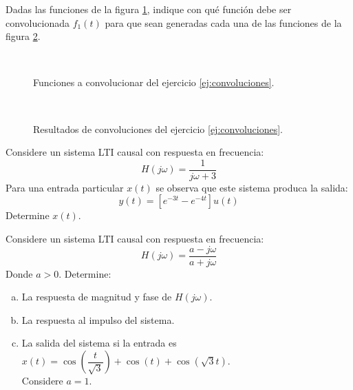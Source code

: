 \begin{ejercicio}
    Dadas las funciones de la figura \ref{fig:5funciones}, indique con qué función debe ser convolucionada $f_1(t)$ para que sean generadas cada una de las funciones de la figura \ref{fig:convoluciones}.
    \label{ej:convoluciones}
    \begin{figure}[!h]
        \centering
        \subfloat{
            
        }
        \subfloat{
            
        }\\
        \subfloat{
            
        }
        \subfloat{
            
        }
        \subfloat{
            
        }
        \caption{Funciones a convolucionar del ejercicio \ref{ej:convoluciones}.}
        \label{fig:5funciones}
    \end{figure}
    \begin{figure}[!h]
        \centering
        \subfloat{
            
        }
        \subfloat{
            
        }\\
        \subfloat{
            
        }
        \subfloat{
            
        }
        \caption{Resultados de convoluciones del ejercicio \ref{ej:convoluciones}.}
        \label{fig:convoluciones}
    \end{figure}
\end{ejercicio}

\begin{ejercicio}
    Considere un sistema LTI causal con respuesta en frecuencia:
    $$ H(j\omega) = \dfrac{1}{j\omega+3} $$
    Para una entrada particular $x(t)$ se observa que este sistema produca la salida:
    $$ y(t) = [e^{-3t}-e^{-4t}]u(t) $$
    Determine $x(t)$.
\end{ejercicio}

\begin{ejercicio}
    Considere un sistema LTI causal con respuesta en frecuencia:
    $$ H(j\omega) = \dfrac{a-j\omega}{a+j\omega}$$
    Donde $a>0$. Determine:
    \begin{enumerate}[a.]
        \item La respuesta de magnitud y fase de $H(j\omega)$.
        \item La respuesta al impulso del sistema.
        \item La salida del sistema si la entrada es $x(t)=\cos\left(\dfrac{t}{\sqrt{3}}\right)+\cos(t)+\cos(\sqrt{3}t)$.\\
        Considere $a=1$.
    \end{enumerate}
\end{ejercicio}
